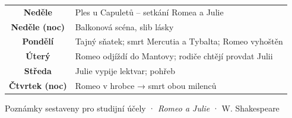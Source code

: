 \documentclass[12pt,a4paper]{article}
\begin{document}
\vspace{1em}

\begin{tcolorbox}[colback=darkbg!80!black, colframe=blue!60!black, coltitle=white, coltext=textmain, title=\textbf{Časová osa – 5 dní děje}, fonttitle=\bfseries]
\begin{tabular}{>{\bfseries}cl}
  Neděle & Ples u Capuletů – setkání Romea a Julie \\
  Neděle (noc) & Balkonová scéna, slib lásky \\
  Pondělí & Tajný sňatek; smrt Mercutia a Tybalta; Romeo vyhoštěn \\
  Úterý & Romeo odjíždí do Mantovy; rodiče chtějí provdat Julii \\
  Středa & Julie vypije lektvar; pohřeb \\
  Čtvrtek (noc) & Romeo v hrobce → smrt obou milenců \\
\end{tabular}
\end{tcolorbox}

\vspace{2em}
\begin{center}
  \textcolor{textdim}{\small Poznámky sestaveny pro studijní účely · \textit{Romeo a Julie} · W. Shakespeare}
\end{center}
\end{document}
